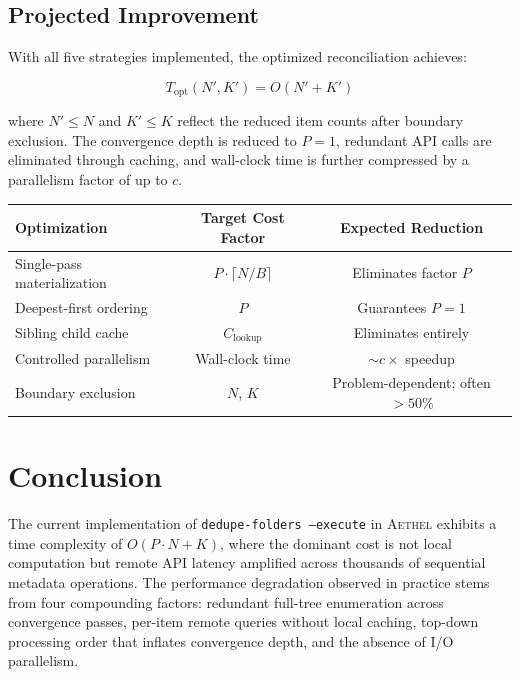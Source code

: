\documentclass[12pt,a4paper]{article}
\begin{document}
\subsection{Projected Improvement}

With all five strategies implemented, the optimized reconciliation achieves:

\begin{equation}
T_{\text{opt}}(N', K') = O(N' + K')
\label{eq:optimized}
\end{equation}

where $N' \leq N$ and $K' \leq K$ reflect the reduced item counts after boundary exclusion. The convergence depth is reduced to $P = 1$, redundant API calls are eliminated through caching, and wall-clock time is further compressed by a parallelism factor of up to $c$.

\begin{center}
\begin{tabular}{l c c}
\toprule
\textbf{Optimization} & \textbf{Target Cost Factor} & \textbf{Expected Reduction} \\
\midrule
Single-pass materialization & $P \cdot \lceil N/B \rceil$ & Eliminates factor $P$ \\
Deepest-first ordering & $P$ & Guarantees $P = 1$ \\
Sibling child cache & $C_{\text{lookup}}$ & Eliminates entirely \\
Controlled parallelism & Wall-clock time & $\sim c\times$ speedup \\
Boundary exclusion & $N$, $K$ & Problem-dependent; often $>50\%$ \\
\bottomrule
\end{tabular}
\end{center}


\section{Conclusion}
\label{sec:conclusion}

The current implementation of \texttt{dedupe-folders~--execute} in \textsc{Aethel} exhibits a time complexity of $O(P \cdot N + K)$, where the dominant cost is not local computation but remote API latency amplified across thousands of sequential metadata operations. The performance degradation observed in practice stems from four compounding factors: redundant full-tree enumeration across convergence passes, per-item remote queries without local caching, top-down processing order that inflates convergence depth, and the absence of I/O parallelism.
\end{document}
